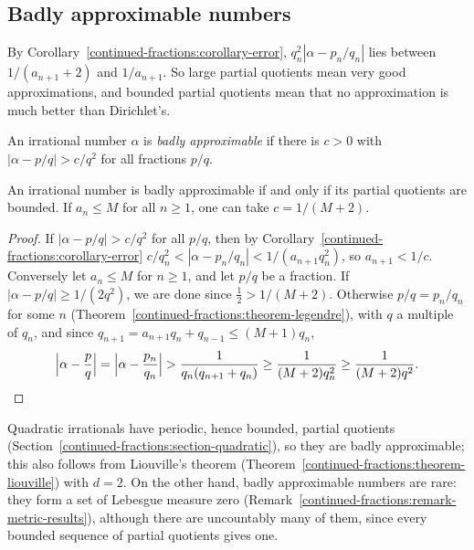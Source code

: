 \subsection{Badly approximable numbers}\label{continued-fractions:subsection-badly}

By Corollary~\ref{continued-fractions:corollary-error}, $q_n^2|\alpha - p_n/q_n|$ lies between $1/(a_{n+1} + 2)$ and $1/a_{n+1}$. So large partial quotients mean very good approximations, and bounded
partial quotients mean that no approximation is much better than Dirichlet's.

\begin{definition}\label{continued-fractions:definition-badly-approximable}
An irrational number $\alpha$ is \emph{badly approximable} if there is $c > 0$ with $|\alpha - p/q| > c/q^2$ for all fractions $p/q$.
\end{definition}

\begin{proposition}\label{continued-fractions:proposition-badly-approximable}
An irrational number is badly approximable if and only if its partial quotients are bounded. If $a_n \leq M$ for all $n \geq 1$, one can take $c = 1/(M + 2)$.
\end{proposition}

\begin{proof}
If $|\alpha - p/q| > c/q^2$ for all $p/q$, then by Corollary~\ref{continued-fractions:corollary-error} $c/q_n^2 < |\alpha - p_n/q_n| < 1/(a_{n+1}q_n^2)$, so $a_{n+1} < 1/c$. Conversely let
$a_n \leq M$ for $n \geq 1$, and let $p/q$ be a fraction. If $|\alpha - p/q| \geq 1/(2q^2)$, we are done since $\frac12 > 1/(M + 2)$. Otherwise $p/q = p_n/q_n$ for some $n$
(Theorem~\ref{continued-fractions:theorem-legendre}), with $q$ a multiple of $q_n$, and since $q_{n+1} = a_{n+1}q_n + q_{n-1} \leq (M + 1)q_n$,
\[
\Bigl|\alpha - \frac pq\Bigr| = \Bigl|\alpha - \frac{p_n}{q_n}\Bigr| > \frac{1}{q_n(q_{n+1} + q_n)} \geq \frac{1}{(M + 2)q_n^2} \geq \frac{1}{(M + 2)q^2}. \qedhere
\]
\end{proof}

Quadratic irrationals have periodic, hence bounded, partial quotients (Section~\ref{continued-fractions:section-quadratic}), so they are badly approximable; this also follows from Liouville's
theorem (Theorem~\ref{continued-fractions:theorem-liouville}) with $d = 2$. On the other hand, badly approximable numbers are rare: they form a set of Lebesgue measure zero
(Remark~\ref{continued-fractions:remark-metric-results}), although there are uncountably many of them, since every bounded sequence of partial quotients gives one.

